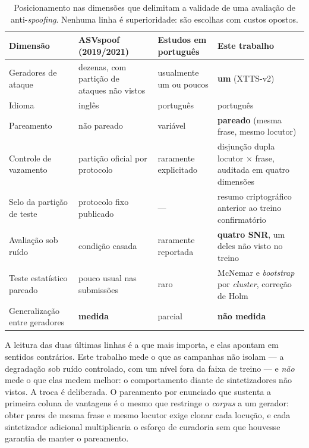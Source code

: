 \documentclass[12pt,a4paper]{article}
\begin{document}
\begin{table}[H]
	\centering
	\caption[Posicionamento nas dimensões de validade da avaliação.]{Posicionamento nas dimensões que delimitam a validade de uma
		avaliação de anti-\textit{spoofing}. Nenhuma linha é superioridade: são
		escolhas com custos opostos.}
	\label{tab:posicionamento}
	\small\singlespacing
	\begin{tabular}{@{}>{\raggedright\arraybackslash}p{3.6cm}
			>{\raggedright\arraybackslash}p{3.5cm}
			>{\raggedright\arraybackslash}p{3.3cm}
			>{\raggedright\arraybackslash}p{3.6cm}@{}}
		\toprule
		\textbf{Dimensão} & \textbf{ASVspoof (2019/2021)} &
		\textbf{Estudos em português} & \textbf{Este trabalho} \\
		\midrule
		Geradores de ataque & dezenas, com partição de ataques não vistos &
		usualmente um ou poucos & \textbf{um} (XTTS-v2) \\
		\addlinespace
		Idioma & inglês & português & português \\
		\addlinespace
		Pareamento & não pareado & variável & \textbf{pareado} (mesma frase, mesmo
		locutor) \\
		\addlinespace
		Controle de vazamento & partição oficial por protocolo & raramente
		explicitado & disjunção dupla locutor $\times$ frase, auditada em quatro
		dimensões \\
		\addlinespace
		Selo da partição de teste & protocolo fixo publicado & --- & resumo
		criptográfico anterior ao treino confirmatório \\
		\addlinespace
		Avaliação sob ruído & condição casada & raramente reportada &
		\textbf{quatro SNR}, um deles não visto no treino \\
		\addlinespace
		Teste estatístico pareado & pouco usual nas submissões & raro & McNemar e
		\textit{bootstrap} por \textit{cluster}, correção de Holm \\
		\addlinespace
		Generalização entre geradores & \textbf{medida} & parcial & \textbf{não
			medida} \\
		\bottomrule
	\end{tabular}
\end{table}

A leitura das duas últimas linhas é a que mais importa, e elas apontam em
sentidos contrários. Este trabalho mede o que as campanhas não isolam --- a
degradação sob ruído controlado, com um nível fora da faixa de treino --- e
\emph{não} mede o que elas medem melhor: o comportamento diante de
sintetizadores não vistos. A troca é deliberada. O pareamento por enunciado que
sustenta a primeira coluna de vantagens é o mesmo que restringe o
\textit{corpus} a um gerador: obter pares de mesma frase e mesmo locutor exige
clonar cada locução, e cada sintetizador
adicional multiplicaria o esforço de curadoria sem que houvesse garantia de
manter o pareamento.
\end{document}
